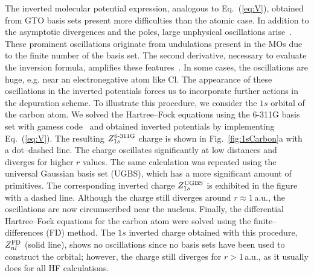 \documentclass[10pt]{article}
\begin{document}
The inverted molecular potential expression, analogous to 
Eq.~(\ref{eq:V}), obtained from GTO basis sets present more 
difficulties than the atomic case. In addition to the asymptotic 
divergences and the poles, large unphysical oscillations 
arise~\cite{Schipper1997,Mura1997,Jacob2011,Gaiduk2013}. These 
prominent oscillations originate from undulations present in the MOs 
due to the finite number of the basis set. The second derivative, 
necessary to evaluate the inversion formula, amplifies these 
features~\cite{Schipper1997,Gaiduk2013}. In some cases, the 
oscillations are huge, e.g. near an electronegative atom like Cl. 
The appearance of these oscillations in the inverted potentials 
forces us to incorporate further actions in the depuration scheme. To 
illustrate this procedure, we consider the $1s$ orbital of the carbon 
atom. We solved the Hartree--Fock equations using the \mbox{6-311G} 
basis set with {\sc gamess} code~\cite{Schmidt1993,Gordon2005} and 
obtained inverted potentials by implementing Eq.~(\ref{eq:V}). 
The resulting $Z_{1s}^{\mbox{\scriptsize 6-311G}}$ charge is shown in 
Fig.~\ref{fig:1sCarbon}a with a dot--dashed line. 
The charge oscillates significantly at low distances and diverges for 
higher $r$ values. The same calculation was 
repeated using the universal Gaussian basis set (UGBS), which has a 
more significant amount of primitives. The corresponding inverted 
charge $Z_{1s}^{\mbox{\scriptsize UGBS}}$ is exhibited in the figure 
with a dashed line. 
Although the charge still diverges around $r\approx1\,$a.u., the 
oscillations are now circumscribed near the nucleus.
Finally, the differential Hartree--Fock equations for the carbon 
atom were solved using the finite--differences (FD) method. 
The $1s$ inverted charge obtained with this procedure, 
$Z_{nl}^{\mbox{\scriptsize FD}}$ (solid line), shows 
no oscillations since no basis sets have been used to construct the 
orbital; however, the charge still 
diverges for $r>1\,$a.u., as it usually does for all HF calculations.
\end{document}
